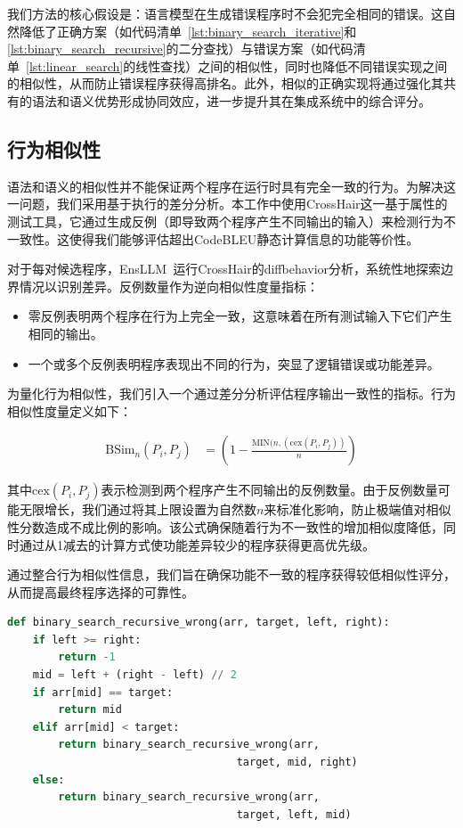 \documentclass{article}
\newcommand{\tool}{EnsLLM}
\begin{document}
我们方法的核心假设是：语言模型在生成错误程序时不会犯完全相同的错误。这自然降低了正确方案（如代码清单~\ref{lst:binary_search_iterative}和\ref{lst:binary_search_recursive}的二分查找）与错误方案（如代码清单~\ref{lst:linear_search}的线性查找）之间的相似性，同时也降低不同错误实现之间的相似性，从而防止错误程序获得高排名。此外，相似的正确实现将通过强化其共有的语法和语义优势形成协同效应，进一步提升其在集成系统中的综合评分。
\subsection{行为相似性}
语法和语义的相似性并不能保证两个程序在运行时具有完全一致的行为。为解决这一问题，我们采用基于执行的差分分析。本工作中使用CrossHair这一基于属性的测试工具，它通过生成反例（即导致两个程序产生不同输出的输入）来检测行为不一致性。这使得我们能够评估超出CodeBLEU静态计算信息的功能等价性。

对于每对候选程序，\tool\ 运行CrossHair的diffbehavior分析，系统性地探索边界情况以识别差异。反例数量作为逆向相似性度量指标：

\begin{itemize}
    \item 零反例表明两个程序在行为上完全一致，这意味着在所有测试输入下它们产生相同的输出。
    \item 一个或多个反例表明程序表现出不同的行为，突显了逻辑错误或功能差异。
\end{itemize}

为量化行为相似性，我们引入一个通过差分分析评估程序输出一致性的指标。行为相似性度量定义如下：

\begin{equation}
\label{eq:beh_similarity}
\begin{split}
    \text{BSim}_n(P_i, P_j) &=  \left(1 - \frac{\text{MIN}(n, ({\text{cex}}(P_i, P_j))}{n} \right)
\end{split}
\end{equation}

\noindent 其中\( \text{cex}(P_i, P_j) \)表示检测到两个程序产生不同输出的反例数量。由于反例数量可能无限增长，我们通过将其上限设置为自然数\( n \)来标准化影响，防止极端值对相似性分数造成不成比例的影响。该公式确保随着行为不一致性的增加相似度降低，同时通过从1减去的计算方式使功能差异较少的程序获得更高优先级。

通过整合行为相似性信息，我们旨在确保功能不一致的程序获得较低相似性评分，从而提高最终程序选择的可靠性。

\begin{lstlisting}[language=Python, caption={Incorrect Recursive Binary Search Implementation}, label={lst:binary_search_recursive_wrong}]
def binary_search_recursive_wrong(arr, target, left, right):
    if left >= right:
        return -1
    mid = left + (right - left) // 2
    if arr[mid] == target:
        return mid
    elif arr[mid] < target:
        return binary_search_recursive_wrong(arr,
                                    target, mid, right)
    else:
        return binary_search_recursive_wrong(arr,
                                    target, left, mid)
\end{lstlisting}
\end{document}
